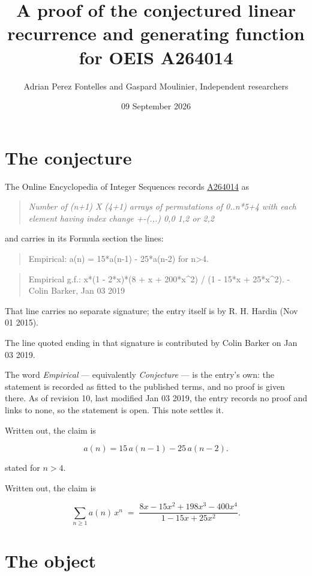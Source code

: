 \documentclass[11pt]{article}
\title{A proof of the conjectured linear recurrence and generating function for OEIS A264014}
\author{Adrian Perez Fontelles and Gaspard Moulinier, Independent researchers}
\date{09 September 2026}
\theoremstyle{definition}
\begin{document}
\maketitle
\section{The conjecture}

The Online Encyclopedia of Integer Sequences records \href{https://oeis.org/A264014}{A264014} as

\begin{quote}\itshape Number of (n+1) X (4+1) arrays of permutations of 0..n*5+4 with each element having index change +-(.,.) 0,0 1,2 or 2,2\end{quote}

and carries in its Formula section the lines:

\begin{quote}\ttfamily Empirical: a(n) = 15*a(n-1) - 25*a(n-2) for n>4.\end{quote}

\begin{quote}\ttfamily Empirical g.f.: x*(1 - 2*x)*(8 + x + 200*x\textasciicircum{}2) / (1 - 15*x + 25*x\textasciicircum{}2). - Colin Barker, Jan 03 2019\end{quote}

That line carries no separate signature; the entry itself is by R. H. Hardin (Nov 01 2015).

The line quoted ending in that signature is contributed by Colin Barker on Jan 03 2019.

The word {\itshape Empirical} --- equivalently {\itshape Conjecture} --- is the entry's own: the statement is recorded as fitted to the published terms, and no proof is given there. As of revision 10, last modified Jan 03 2019, the entry records no proof and links to none, so the statement is open. This note settles it.

Written out, the claim is

\[a(n) = 15\,a(n-1) - 25\,a(n-2).\]

stated for $n > 4$.

Written out, the claim is

\[\sum_{n \ge 1} a(n)\,x^n \;=\; \frac{8x - 15x^{2} + 198x^{3} - 400x^{4}}{1 - 15x + 25x^{2}}.\]

\section{The object}
\end{document}
